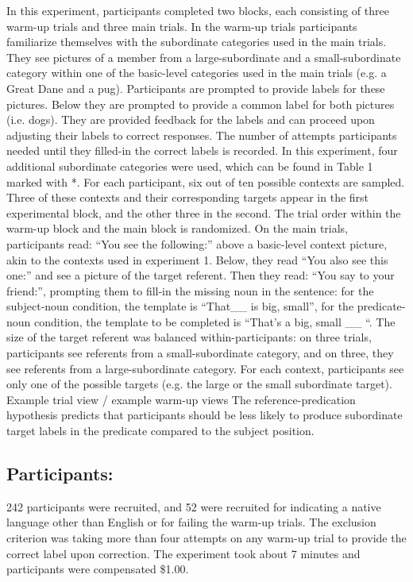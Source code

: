 In this experiment, participants completed two blocks, each consisting of three warm-up trials and three main trials. In the warm-up trials participants familiarize themselves with the subordinate categories used in the main trials. They see pictures of a member from a large-subordinate and a small-subordinate category within one of the basic-level categories used in the main trials (e.g. a Great Dane and a pug). Participants are prompted to provide labels for these pictures. Below they are prompted to provide a common label for both pictures (i.e. dogs). They are provided feedback for the labels and can proceed upon adjusting their labels to correct responses. The number of attempts participants needed until they filled-in the correct labels is recorded. In this experiment, four additional subordinate categories were used, which can be found in Table 1 marked with *. For each participant, six out of ten possible contexts are sampled. Three of these contexts and their corresponding targets appear in the first experimental block, and the other three in the second. The trial order within the warm-up block and the main block is randomized. 
On the main trials, participants read: “You see the following:” above a basic-level context picture, akin to the contexts used in experiment 1. Below, they read “You also see this one:” and see a picture of the target referent. Then they read: “You say to your friend:”, prompting them to fill-in the missing noun in the sentence: for the subject-noun condition, the template is “That\_\_ is {big, small}”, for the predicate-noun condition, the template to be completed is “That’s a {big, small} \_\_ “.  
The size of the target referent was balanced within-participants: on three trials, participants see referents from a small-subordinate category, and on three, they see referents from a large-subordinate category. For each context, participants see only one of the possible targets (e.g. the large or the small subordinate target).
Example trial view / example warm-up views
The reference-predication hypothesis predicts that participants should be less likely to produce subordinate target labels in the predicate compared to the subject position.

\subsection{Participants:}
242 participants were recruited, and 52 were recruited for indicating a native language other than English or for failing the warm-up trials. The exclusion criterion was taking more than four attempts on any warm-up trial to provide the correct label upon correction. The experiment took about 7 minutes and participants were compensated \$1.00. 
 
